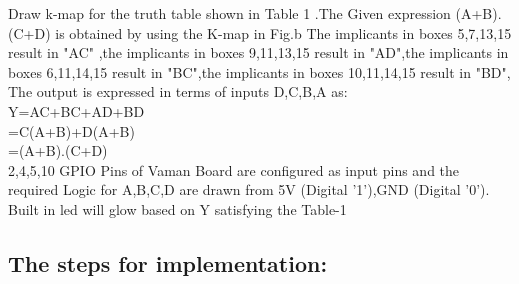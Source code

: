 \documentclass[10pt, a4paper]{article}
\begin{document}
Draw k-map for  the truth table shown in Table 1 .The Given expression  (A+B).(C+D) is obtained by  using the K-map in Fig.b 
The implicants in boxes 5,7,13,15 result in "AC" ,the implicants in boxes 9,11,13,15 result in "AD",the implicants in boxes 6,11,14,15 result in "BC",the implicants in boxes 10,11,14,15 result in "BD",
\\The output is expressed in terms of inputs D,C,B,A as: 
\\Y=AC+BC+AD+BD
\\ =C(A+B)+D(A+B)
\\ =(A+B).(C+D)\\
2,4,5,10 GPIO Pins of Vaman Board are configured as input pins and the required Logic for A,B,C,D are drawn from 5V (Digital '1'),GND (Digital '0'). Built in led will glow based on Y satisfying the Table-1
\subsection{The steps for implementation:}
\end{document}
